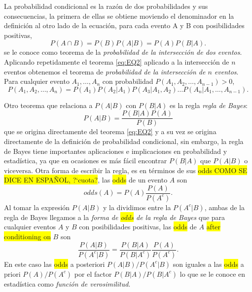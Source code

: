 \documentclass[12pt,letterpaper]{article}
\begin{document}
La probabilidad condicional es la razón de dos probabilidades y sus consecuencias, la primera de ellas se obtiene moviendo el denominador en la definición al otro lado de la ecuación, para cada evento {A} y {B} con posibilidades positivas,
\begin{equation}\label{eq:EQ2}
P(A\cap B)=P(B)P(A|B)=P(A)P(B|A).
\end{equation}
se le conoce como teorema de la \emph{probabilidad de la intersección de dos eventos}. Aplicando repetidamente el teorema \eqref{eq:EQ2} aplicado a la intersección de $n$ eventos obtenemos el teorema de \emph{probabilidad de la intersección de $n$ eventos}. Para cualquier evento $A_1,\ldots,A_n$ con probabilidad $P(A_1,A_2,\ldots,A_{n-1})>0$,
\begin{equation}
P(A_1,A_2,\ldots,A_n)=P(A_1)P(A_2|A_1)P(A_3|A_1,A_2)\ldots P(A_n|A_1,\ldots,A_{n-1}).
\end{equation}

Otro teorema que relaciona a $P(A|B)$ con $P(B|A)$ es la regla \emph{regla de Bayes}:
\begin{equation}
P(A|B)=\frac{P(B|A)P(A)}{P(B)}
\end{equation}
que se origina directamente del teorema \eqref{eq:EQ2} y a su vez se origina directamente de la definición de probabilidad condicional, sin embargo, la regla de Bayes tiene importantes aplicaciones e implicaciones en probabilidad y estadística, ya que en ocasiones es más fácil encontrar $P(B|A)$ que $P(A|B)$ o viceversa. Otra forma de escribir la regla, es en términos de sus \colorbox{yellow}{odds COMO SE DICE EN ESPAÑOL, ?`cuota?}, las \colorbox{yellow}{odds} de un evento $A$ son
\begin{equation}
odds(A)=P(A)\frac{P(A)}{P(A^c)}.
\end{equation}
Al tomar la expresión $P(A|B)$ y la dividimos entre la $P(A^c|B)$, ambas de la regla de Bayes llegamos a la \emph{forma de \colorbox{yellow}{odds} de la regla de Bayes} que para cualquier eventos $A$ y $B$ con posibilidades positivas, las \colorbox{yellow}{odds} de $A$ \colorbox{yellow}{after conditioning on} $B$ son
\begin{equation}
\frac{P(A|B)}{P(A^c|B)}=\frac{P(B|A)}{P(B|A^c)}\frac{P(A)}{P(A^c)}.
\end{equation}
En este caso las \colorbox{yellow}{odds} a posteriori $P(A|B)/P(A^c|B)$ son iguales a las \colorbox{yellow}{odds} a priori $P(A)/P(A^c)$ por el factor $P(B|A)/P(B|A^c)$ lo que se le conoce en estadística como \emph{función de verosimilitud}.
\end{document}
